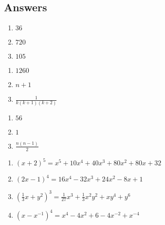 \newpage

\subsection{Answers}



\begin{multicols}{3}
\begin{enumerate}

\item  $36$

\item  $720$

\item  $105$

\setcounter{HW}{\value{enumi}}
\end{enumerate}
\end{multicols}

\begin{multicols}{3}
\begin{enumerate}
\setcounter{enumi}{\value{HW}}

\item  $1260$

\item  $n+1$

\item  $\frac{1}{k(k+1)(k+2)}$

\setcounter{HW}{\value{enumi}}
\end{enumerate}
\end{multicols}

\begin{multicols}{3}
\begin{enumerate}
\setcounter{enumi}{\value{HW}}

\item  $56$

\item  $1$

\item  $\frac{n(n-1)}{2}$

\setcounter{HW}{\value{enumi}}
\end{enumerate}
\end{multicols}


\begin{enumerate}
\setcounter{enumi}{\value{HW}}

\item  $(x+2)^5 = x^5+10x^4+40x^3+80x^2+80x+32$

\item  $(2x-1)^4 = 16x^4-32x^3+24x^2-8x+1$

\item  $\left(\frac{1}{3} x +  y^2\right)^3 = \frac{1}{27} x^3+\frac{1}{3}x^2y^2+xy^4+y^6$

\item  $\left(x - x^{-1} \right)^{4} = x^4-4x^2+6-4x^{-2}+x^{-4}$

\setcounter{HW}{\value{enumi}}
\end{enumerate}


